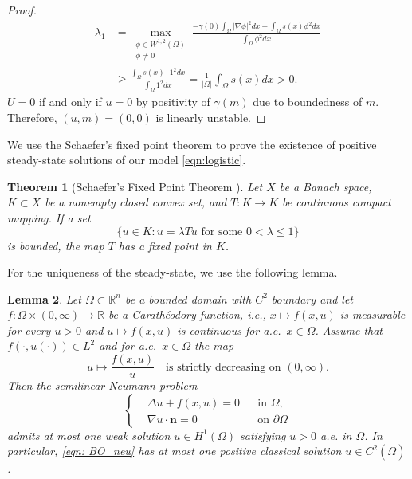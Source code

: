 \documentclass{article}
\newtheorem{theorem}{Theorem}[section]
\newtheorem{lemma}[theorem]{Lemma}
\begin{document}
\begin{proof}
    \begin{equation}\label{lambda1}
        \begin{aligned}
            \lambda_1 &= \max_{\substack{\phi\in W^{1,2}(\Omega)\\ \phi\neq 0}} \frac{-\gamma(0)\int_\Omega |\nabla \phi|^2dx +\int_\Omega  s(x)\phi^2dx}{\int_\Omega \phi^2dx}\\
            &\ge  \frac{\int_\Omega s(x)\cdot 1^2dx}{\int_\Omega 1^2dx}= \frac{1}{|\Omega|}\int_\Omega  s(x)dx>0.
        \end{aligned}
    \end{equation} $U=0$ if and only if $u=0$ by positivity of $\gamma(m)$ due to boundedness of $m$. Therefore, $(u,m)=(0,0)$ is linearly unstable.
\end{proof}

We use the Schaefer's fixed point theorem to prove the existence of positive steady-state solutions of our model \eqref{eqn:logistic}. 

\begin{theorem}[Schaefer's Fixed Point Theorem \cite{EvansPDE}]\label{thm:Schaefer}Let $X$ be a Banach space, $K \subset  X$ be a nonempty closed convex set, and $T : K \rightarrow  K$ be continuous compact mapping. If a set$$\{ u \in  K : u = \lambda Tu \text{ for some } 0 < \lambda  \leq  1\}$$ is bounded, the map $T$ has a fixed point in $K$.
\end{theorem}

For the uniqueness of the steady-state, we use the following lemma.
\begin{lemma}\label{lem:BO}
Let $\Omega\subset\mathbb{R}^n$ be a bounded domain with $C^{2}$ boundary and let
$f:\Omega\times(0,\infty)\to\mathbb{R}$ be a Carath\'eodory function, i.e.,
$x\mapsto f(x,u)$ is measurable for every $u>0$ and $u\mapsto f(x,u)$ is
continuous for a.e.\ $x\in\Omega$.
Assume that $f(\cdot,u(\cdot))\in L^2$ and for a.e.\ $x\in\Omega$ the map
\[
u\mapsto \frac{f(x,u)}{u}
\quad\text{is strictly decreasing on }(0,\infty).
\]
Then the semilinear Neumann problem
\begin{equation}\label{eqn: BO_neu}
\left\{\begin{aligned}
&\Delta u + f(x,u)=0 && \text{in }\Omega,\\
&\nabla u\cdot \boldsymbol{n} = 0 &&  \text{on }\partial\Omega
\end{aligned}\right.
\end{equation}
admits at most one weak solution $u\in H^{1}(\Omega)$ satisfying $u>0$ a.e. in $\Omega$.
In particular, \eqref{eqn: BO_neu} has at most one positive classical solution
$u\in C^{2}(\bar\Omega)$.
\end{lemma}
\end{document}
